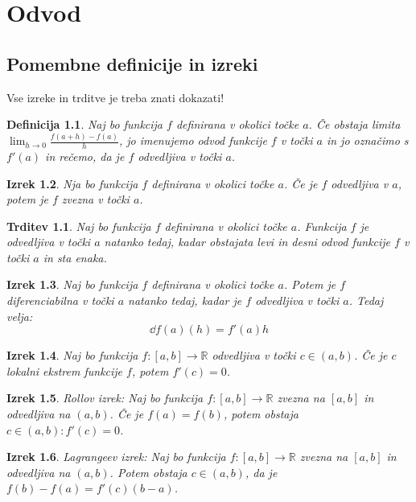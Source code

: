 \documentclass[a4paper,12pt]{report}
\newtheorem{izrek}{Izrek}[section]
\newtheorem{definicija}[izrek]{Definicija}
\newtheorem{trditev}{Trditev}
\begin{document}
\chapter{Odvod}

\section*{Pomembne definicije in izreki}

Vse izreke in trditve je treba znati dokazati!

\begin{definicija}
    Naj bo funkcija $f$ definirana v okolici točke $a$. Če obstaja limita
     $\lim_{h\to 0}\frac{f(a+h)-f(a)}{h}$, jo imenujemo odvod funkcije $f$ v 
     točki $a$ in jo označimo s $f'(a)$ in rečemo, da je $f$ odvedljiva v točki $a$.
\end{definicija}

\begin{izrek}
    Nja bo funkcija $f$ definirana v okolici točke $a$. Če je $f$ odvedljiva v $a$, 
    potem je $f$ zvezna v točki $a$.
\end{izrek}

\begin{trditev}
    Naj bo funkcija $f$ definirana v okolici točke $a$. Funkcija $f$ je odvedljiva v točki $a$
     natanko tedaj, kadar obstajata levi in desni odvod funkcije $f$ v točki $a$ in sta enaka.
\end{trditev}

\begin{izrek}
    Naj bo funkcija $f$ definirana v okolici točke $a$. Potem je $f$ diferenciabilna v točki $a$ 
    natanko tedaj, kadar je $f$ odvedljiva v točki $a$. Tedaj velja: $$\dd f(a)(h)=f'(a) h$$ 
\end{izrek}

\begin{izrek}
    Naj bo funkcija $f: [a,b] \to \mathbb{R}$ odvedljiva v točki $c \in (a,b)$. 
    Če je $c$ lokalni ekstrem funkcije $f$, potem $f'(c)=0$. 
\end{izrek}

\begin{izrek}
    \emph{Rollov izrek}: Naj bo funkcija $f: [a,b] \to \mathbb{R}$ zvezna na $[a,b]$ in odvedljiva na $(a,b)$. 
    Če je $f(a)=f(b)$, potem obstaja $c \in (a,b): f'(c)=0$.
\end{izrek}

\begin{izrek}
    \emph{Lagrangeev izrek}: Naj bo funkcija $f: [a,b] \to \mathbb{R}$ zvezna na $[a,b]$ in odvedljiva na $(a,b)$. 
    Potem obstaja $c \in (a,b)$, da je $f(b)-f(a)=f'(c)(b-a)$.
\end{izrek}
\end{document}
